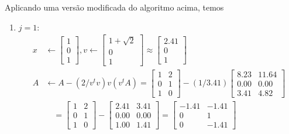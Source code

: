 \documentclass[a4paper,12pt, leqno, answers]{exam}
\begin{document}
\begin{questions}
\begin{parts}
\begin{solution}
            Aplicando uma vers\~{a}o modificada do algoritmo acima, temos
            \begin{enumerate}
                \item $j = 1$:
                    \begin{align*}
                        x &\leftarrow \begin{bmatrix}
                            1 \\
                            0 \\
                            1
                        \end{bmatrix}, v \leftarrow \begin{bmatrix}
                            1 + \sqrt{2} \\
                            0 \\
                            1
                        \end{bmatrix} \approx \begin{bmatrix}
                            2.41 \\
                            0 \\
                            1
                        \end{bmatrix}\\
                        A &\leftarrow A - (2 / v^t v) v (v^t A) = \begin{bmatrix}
                            1 & 2 \\
                            0 & 1 \\
                            1 & 0
                        \end{bmatrix} -  (1 / 3.41) \begin{bmatrix}
                            8.23 & 11.64 \\
                            0.00 & 0.00 \\
                            3.41 & 4.82
                        \end{bmatrix} \\
                        &\quad = \begin{bmatrix}
                            1 & 2 \\
                            0 & 1 \\
                            1 & 0
                        \end{bmatrix} -  \begin{bmatrix}
                            2.41 & 3.41 \\
                            0.00 & 0.00 \\
                            1.00 & 1.41
                        \end{bmatrix}  = \begin{bmatrix}
                            -1.41 & - 1.41 \\
                            0 & 1 \\
                            0 & - 1.41
                        \end{bmatrix}
                    \end{align*}


\end{enumerate}
\end{solution}
\end{parts}
\end{questions}
\end{document}
